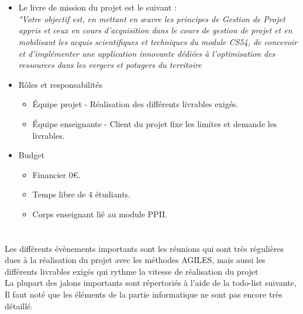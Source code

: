 \documentclass{report}
\begin{document}
\section*{\color{orange}{\Large Organisation / ressources, budget}}
\begin{itemize}
    \item Le livre de mission du projet est le suivant : \\ 
    \textit{"Votre objectif est, en mettant en œuvre les principes de Gestion de Projet appris et
    ceux en cours d’acquisition dans le cours de gestion de projet et en mobilisant les acquis
    scientifiques et techniques du module CS54, de concevoir et d’implémenter une application
    innovante dédiées à l’optimisation des ressources dans les vergers et potagers du territoire}
    \item Rôles et responsabilités
    \begin{itemize}
        \item Équipe projet - Réalisation des différents livrables exigés.
        \item Équipe enseignante - Client du projet fixe les limites et demande les livrables.
    \end{itemize}
    \item Budget
    \begin{itemize}
        \item Financier 0€.
        \item Temps libre de 4 étudiants.
        \item Corps enseignant lié au module PPII.
    \end{itemize}
    
\end{itemize}
\section*{\color{orange}{\Large Jalons : échéancier / évènements importants }}
Les différents évènements importants sont les réunions qui sont très régulières dues à la réalisation du projet avec les méthodes AGILES, mais aussi les différents livrables exigés qui rythme la vitesse de réalisation du projet
\vspace{0.5cm} \\
La plupart des jalons importants sont répertoriés à l'aide de la todo-list suivante, Il faut noté que les éléments de la partie informatique ne sont pas encore très détaillé.
\end{document}
